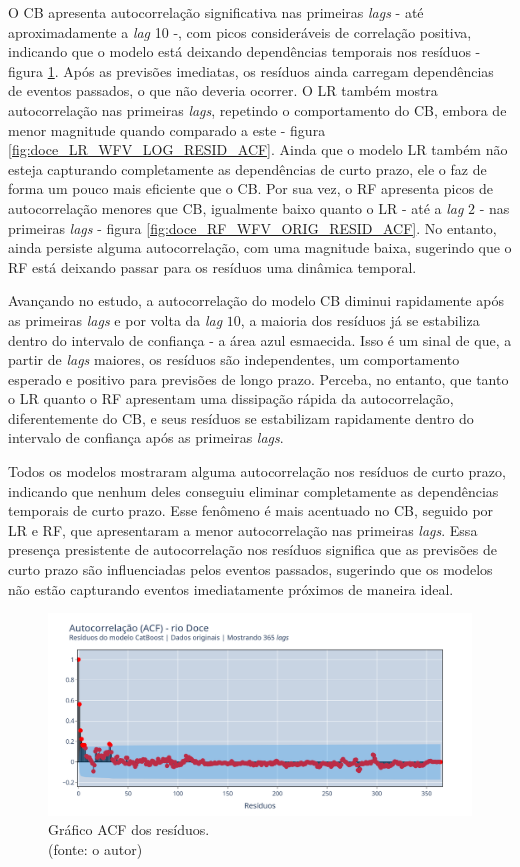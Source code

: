 O CB apresenta autocorrelação significativa nas primeiras \textit{lags} - até aproximadamente a \textit{lag} 10 -, com picos consideráveis de correlação positiva, indicando que o modelo está deixando dependências temporais nos resíduos - figura \ref{fig:doce_CB_WFV_ORIG_RESID_ACF}. Após as previsões imediatas, os resíduos ainda carregam dependências de eventos passados, o que não deveria ocorrer. O LR também mostra autocorrelação nas primeiras \textit{lags}, repetindo o comportamento do CB, embora de menor magnitude quando comparado a este - figura \ref{fig:doce_LR_WFV_LOG_RESID_ACF}. Ainda que o modelo LR também não esteja capturando completamente as dependências de curto prazo, ele o faz de forma um pouco mais eficiente que o CB. Por sua vez, o RF apresenta picos de autocorrelação menores que CB, igualmente baixo quanto o LR - até a \textit{lag} $2$ - nas primeiras \textit{lags} - figura \ref{fig:doce_RF_WFV_ORIG_RESID_ACF}. No entanto, ainda persiste alguma autocorrelação, com uma magnitude baixa, sugerindo que o RF está deixando passar para os resíduos uma dinâmica temporal.

Avançando no estudo, a autocorrelação do modelo CB diminui rapidamente após as primeiras \textit{lags} e por volta da \textit{lag} $10$, a maioria dos resíduos já se estabiliza dentro do intervalo de confiança - a área azul esmaecida. Isso é um sinal de que, a partir de \textit{lags} maiores, os resíduos são independentes, um comportamento esperado e positivo para previsões de longo prazo. Perceba, no entanto, que tanto o LR quanto o RF apresentam uma dissipação rápida da autocorrelação, diferentemente do CB, e seus resíduos se estabilizam rapidamente dentro do intervalo de confiança após as primeiras \textit{lags}.

Todos os modelos mostraram alguma autocorrelação nos resíduos de curto prazo, indicando que nenhum deles conseguiu eliminar completamente as dependências temporais de curto prazo. Esse fenômeno é mais acentuado no CB, seguido por LR e RF, que apresentaram a menor autocorrelação nas primeiras \textit{lags}. Essa presença presistente de autocorrelação nos resíduos significa que as previsões de curto prazo são influenciadas pelos eventos passados, sugerindo que os modelos não estão capturando eventos imediatamente próximos de maneira ideal.

\begin{figure}[!h]
	\centering
	\includegraphics[scale=0.33]{Figuras/rio_doce/wfv/CB/CB_WFV_ORIG_RESID_ACF.png}
	\caption{Gráfico ACF dos resíduos.\\(fonte: o autor)}
	\label{fig:doce_CB_WFV_ORIG_RESID_ACF}
\end{figure}

